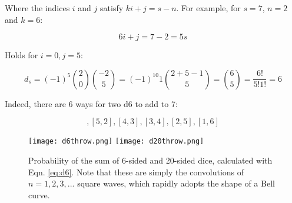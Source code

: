 Where the indices $i$ and $j$ satisfy $ki+j = s-n$. For example, for $s=7$, $n=2$ and $k=6$:

\begin{equation}
6i+j = 7-2 = 5s
\end{equation}

Holds for $i=0, j=5$:

\begin{equation}
d_s = (-1)^5 {2 \choose 0}{-2 \choose 5} = (-1)^{10} 1 {2+5-1 \choose 5} = {6 \choose 5} = \frac{6!}{5!1!} = 6
\label{eq:d6}
\end{equation}

Indeed, there are 6 ways for two d6 to add to 7:

\begin{equation}
[6,1],[5,2],[4,3],[3,4],[2,5],[1,6]
\end{equation}


\begin{figure}
\centering
\texttt{[image: d6throw.png]}
\texttt{[image: d20throw.png]}
\caption{Probability of the sum of 6-sided and 20-sided dice, calculated with Eqn. \ref{eq:d6}. Note that these are simply the convolutions of $n=1,2,3,...$ square waves, which rapidly adopts the shape of a Bell curve.}
\end{figure}
